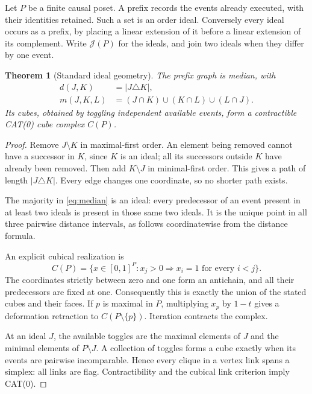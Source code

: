 \documentclass[11pt]{article}
\newtheorem{theorem}{Theorem}[section]
\theoremstyle{definition}
\newcommand{\Id}{\mathcal J}
\numberwithin{equation}{section}
\begin{document}
Let $P$ be a finite causal poset. A prefix records the events already
executed, with their identities retained. Such a set is an order ideal.
Conversely every ideal occurs as a prefix, by placing a linear
extension of it before a linear extension of its complement.
Write $\Id(P)$ for the ideals, and join two ideals when they differ
by one event.

\begin{theorem}[Standard ideal geometry]\label{thm:geometry}
The prefix graph is median, with
\begin{align}\label{eq:median}
 d(J,K)&=|J\triangle K|,\\
 m(J,K,L)&=(J\cap K)\cup(K\cap L)\cup(L\cap J).\nonumber
\end{align}
Its cubes, obtained by toggling independent available events, form
a contractible CAT(0) cube complex $C(P)$.
\end{theorem}
\begin{proof}
Remove $J\setminus K$ in maximal-first order. An element being
removed cannot have a successor in $K$, since $K$ is an ideal;
all its successors outside $K$ have already been removed.
Then add $K\setminus J$ in minimal-first order. This gives a path
of length $|J\triangle K|$. Every edge changes one coordinate,
so no shorter path exists.

The majority in \eqref{eq:median} is an ideal: every predecessor
of an event present in at least two ideals is present in those same
two ideals. It is the unique point in all three pairwise distance
intervals, as follows coordinatewise from the distance formula.

An explicit cubical realization is
\begin{equation}\label{eq:cubical}
 C(P)=\{x\in[0,1]^P:x_j>0\Longrightarrow x_i=1
                            \text{ for every }i<j\}.
\end{equation}
The coordinates strictly between zero and one form an antichain,
and all their predecessors are fixed at one. Consequently this
is exactly the union of the stated cubes and their faces.
If $p$ is maximal in $P$, multiplying $x_p$ by $1-t$ gives a
deformation retraction to $C(P\setminus\{p\})$.
Iteration contracts the complex.

At an ideal $J$, the available toggles are the maximal elements
of $J$ and the minimal elements of $P\setminus J$.
A collection of toggles forms a cube exactly when its events are
pairwise incomparable. Hence every clique in a vertex link spans
a simplex: all links are flag. Contractibility and the cubical
link criterion \cite[Theorem 2.1]{AOS} imply CAT(0).
\end{proof}
\end{document}
